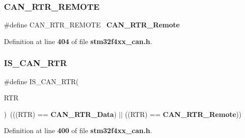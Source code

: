 \subsubsection{C\+A\+N\+\_\+\+R\+T\+R\+\_\+\+R\+E\+M\+O\+TE}
{\footnotesize\ttfamily \#define C\+A\+N\+\_\+\+R\+T\+R\+\_\+\+R\+E\+M\+O\+TE~\textbf{ C\+A\+N\+\_\+\+R\+T\+R\+\_\+\+Remote}}



Definition at line \textbf{ 404} of file \textbf{ stm32f4xx\+\_\+can.\+h}.

\mbox{\label{group__CAN__remote__transmission__request_ga3379997ad4da6fc4d7975c52b891bdc0}} 
\subsubsection{I\+S\+\_\+\+C\+A\+N\+\_\+\+R\+TR}
{\footnotesize\ttfamily \#define I\+S\+\_\+\+C\+A\+N\+\_\+\+R\+TR(\begin{DoxyParamCaption}\item[{}]{R\+TR }\end{DoxyParamCaption})~(((R\+TR) == \textbf{ C\+A\+N\+\_\+\+R\+T\+R\+\_\+\+Data}) $\vert$$\vert$ ((R\+TR) == \textbf{ C\+A\+N\+\_\+\+R\+T\+R\+\_\+\+Remote}))}



Definition at line \textbf{ 400} of file \textbf{ stm32f4xx\+\_\+can.\+h}.

